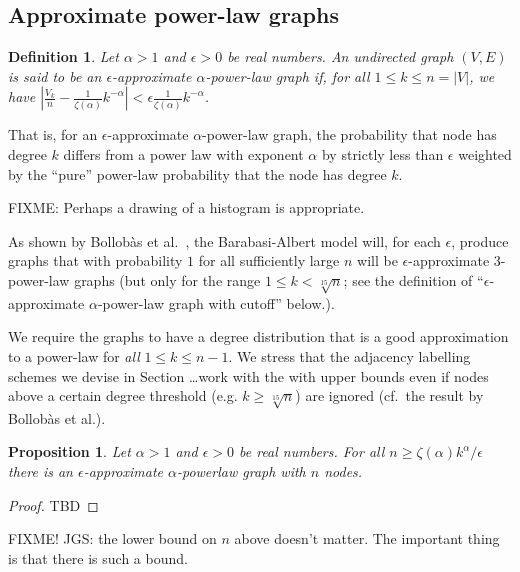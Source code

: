 \documentclass{article}
\newtheorem{definition}{Definition}
\newtheorem{proposition}{Proposition}
\theoremstyle{remark}
\begin{document}
\subsection{Approximate power-law graphs}
 

 \begin{definition}\label{def:approximate}
 Let $\alpha > 1$ and $\epsilon > 0$ be real numbers.
 An undirected graph $(V,E)$ is said to be an $\epsilon$-\emph{approximate} $\alpha$-\emph{power-law graph}
 if, for all $1 \leq k \leq n = \vert V \vert$, we have $\left\vert \frac{V_k}{n} - \frac{1}{\zeta(\alpha)} k^{-\alpha} \right\vert < \epsilon \frac{1}{\zeta(\alpha)} k^{-\alpha}$.
 \end{definition}
 
 That is, for an $\epsilon$-approximate $\alpha$-power-law graph, the probability that node has degree $k$ differs from
 a power law with exponent $\alpha$ by strictly less than $\epsilon$ weighted by the ``pure'' power-law probability
 that the node has degree $k$.
 
 FIXME: Perhaps a drawing of a histogram is appropriate. 
 
 As shown by Bollob{\`a}s et al.\ \cite{}, the Barabasi-Albert model will, for each $\epsilon$,
 produce graphs that with probability $1$ for all sufficiently large $n$ will be $\epsilon$-approximate
 $3$-power-law graphs (but only for the range $1 \leq k < \sqrt[15]{n}$; see the definition of ``$\epsilon$-approximate
 $\alpha$-power-law graph with cutoff'' below.).
  
We require the graphs to have a degree distribution that is a good approximation to a power-law for
\emph{all} $1 \leq k \leq n-1$. We stress that the adjacency labelling schemes we devise in Section \ldots work with the with upper bounds even if nodes above a certain degree threshold (e.g. $k \geq \sqrt[15]{n}$) are ignored (cf.\ the result by Bollob{\`a}s et al.).
  
\begin{proposition}
Let $\alpha > 1$ and $\epsilon > 0$ be real numbers. For all $n \geq \zeta(\alpha) k^{\alpha}/\epsilon$
there is an $\epsilon$-approximate $\alpha$-powerlaw graph with $n$ nodes.
 \end{proposition} 
  
\begin{proof}
 TBD
\end{proof} 
  
 FIXME! JGS: the lower bound on $n$ above doesn't matter. The important thing is that there is such a bound. 
  
\end{document}
